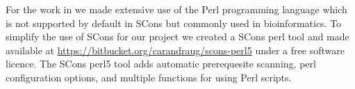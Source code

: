 For the work in  we made extensive use of
the Perl programming language which is not supported by default in
SCons but commonly used in bioinformatics.
To simplify the use of SCons for our project we created
a SCons perl tool and made available at
\url{https://bitbucket.org/carandraug/scons-perl5} under a free
software licence.  The SCons perl5 tool adds automatic prerequesite
scanning, perl configuration options, and multiple functions for using
Perl scripts.


